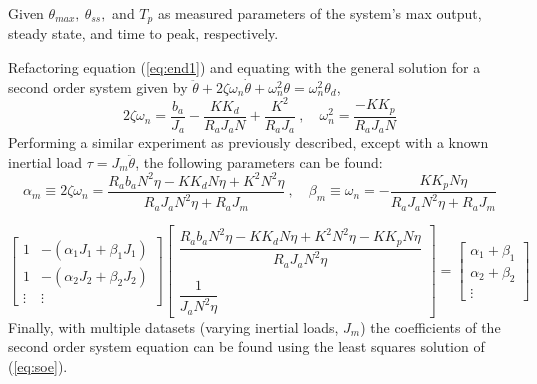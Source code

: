 \documentclass[12pt]{report}
\begin{document}
Given $\theta_{max},~\theta_{ss},$ and $T_p$ as measured parameters of the system's max output, steady state, and time to peak, respectively.

Refactoring equation (\ref{eq:end1}) and equating with the general solution for a second order system given by $\ddot{\theta} + 2\zeta\omega_n\dot{\theta} + \omega_n^2\theta = \omega_n^2\theta_d$,
\begin{equation}
  2\zeta\omega_n = \frac{b_a}{J_a} - \frac{KK_d}{R_aJ_aN} + \frac{K^2}{R_aJ_a}~,\quad
  \omega_n^2 = \frac{-KK_p}{R_aJ_aN}
\end{equation}
Performing a similar experiment as previously described, except with a known inertial load $\tau = J_m\ddot{\theta}$, the following parameters can be found:
\begin{equation}
  \alpha_m \equiv 2\zeta\omega_n = \frac{R_ab_aN^2\eta-KK_dN\eta+K^2N^2\eta}{R_aJ_aN^2\eta+R_aJ_m}~,\quad
  \beta_m \equiv \omega_n =-\frac{KK_pN\eta}{R_aJ_aN^2\eta+R_aJ_m}
\end{equation}

\begin{equation}
\begin{bmatrix}
  1 & -(\alpha_1J_1+\beta_1J_1) \\
  1 & -(\alpha_2J_2+\beta_2J_2) \\
  \vdots & \vdots
\end{bmatrix}
\begin{bmatrix}
  \dfrac{R_ab_aN^2\eta-KK_dN\eta+K^2N^2\eta-KK_pN\eta}{R_aJ_aN^2\eta} \\
  ~\\
  \dfrac{1}{J_aN^2\eta}
\end{bmatrix}
=
\begin{bmatrix}
  \alpha_1+\beta_1 \\
  \alpha_2+\beta_2 \\
  \vdots
\end{bmatrix}
\label{eq:soe}
\end{equation}
Finally, with multiple datasets (varying inertial loads, $J_m$) the coefficients of the second order system equation can be found using the least squares solution of (\ref{eq:soe}).





\end{document}
